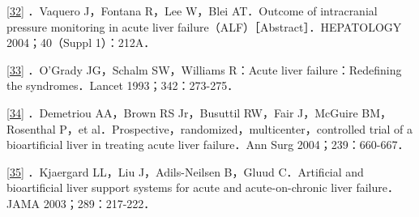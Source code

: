 \protect\hyperlink{text00019.htmlux5cux23ch32-18-back}{{[}32{]}}
．Vaquero J，Fontana R，Lee W，Blei AT．Outcome of intracranial pressure
monitoring in acute liver failure（ALF）［Abstract］．HEPATOLOGY
2004；40（Suppl 1）：212A．

\protect\hyperlink{text00019.htmlux5cux23ch33-18-back}{{[}33{]}}
．O'Grady JG，Schalm SW，Williams R：Acute liver failure：Redefining the
syndromes．Lancet 1993；342：273-275．

\protect\hyperlink{text00019.htmlux5cux23ch34-18-back}{{[}34{]}}
．Demetriou AA，Brown RS Jr，Busuttil RW，Fair J，McGuire BM，Rosenthal
P，et al．Prospective，randomized，multicenter，controlled trial of a
bioartificial liver in treating acute liver failure．Ann Surg
2004；239：660-667．

\protect\hyperlink{text00019.htmlux5cux23ch35-18-back}{{[}35{]}}
．Kjaergard LL，Liu J，Adils-Neilsen B，Gluud C．Artificial and
bioartificial liver support systems for acute and acute-on-chronic liver
failure．JAMA 2003；289：217-222．

\protect\hypertarget{text00020.html}{}{}

